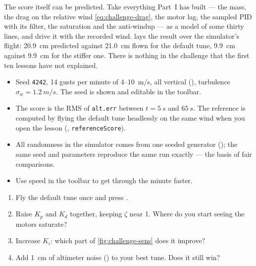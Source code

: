 The score itself can be predicted. Take everything Part~I has built — the mass, the drag on the relative wind \eqref{eq:challenge-drag}, the motor lag, the sampled PID with its filter, the saturation and the anti-windup — as a model of some thirty lines, and drive it with the recorded wind.  lays the result over the simulator's flight: \SI{20.9}{cm} predicted against \SI{21.0}{cm} flown for the default tune, \SI{9.9}{cm} against \SI{9.9}{cm} for the stiffer one. There is nothing in the challenge that the first ten lessons have not explained.


\begin{inapp}
\begin{itemize}[leftmargin=1.2em]
  \item Seed \texttt{4242}, 14 gusts per minute of 4–\SI{10}{m/s}, all vertical (), turbulence $\sigma_w = \SI{1.2}{m/s}$. The seed is shown and editable in the toolbar.
  \item The score is the RMS of \texttt{alt.err} between $t = \SI{5}{s}$ and $\SI{65}{s}$. The reference is computed by flying the default tune headlessly on the same wind when you open the lesson (, \texttt{referenceScore}).
  \item All randomness in the simulator comes from one seeded generator (); the same seed and parameters reproduce the same run exactly — the basis of fair comparisons.
  \item Use  speed in the toolbar to get through the minute faster.
\end{itemize}
\end{inapp}

\begin{trythis}
\begin{enumerate}
  \item Fly the default tune once and press .
  \item Raise $K_p$ and $K_d$ together, keeping $\zeta$ near 1. Where do you start seeing the motors saturate?
  \item Increase $K_i$: which part of \cref{fig:challenge-sens} does it improve?
  \item Add \SI{1}{cm} of altimeter noise () to your best tune. Does it still win?
\end{enumerate}
\end{trythis}

